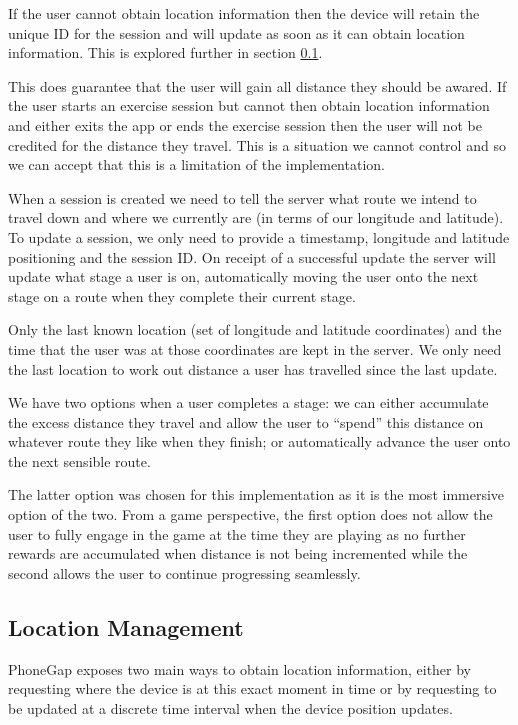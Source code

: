 If the user cannot obtain location information then the device will
retain the unique ID for the session and will update as soon as it can
obtain location information. This is explored further in section
\ref{sec:location_mgmt}.

This does guarantee that the user will gain all distance they should
be awared. If the user starts an exercise session but cannot then
obtain location information and either exits the app or ends the
exercise session then the user will not be credited for the distance
they travel. This is a situation we cannot control and so we can
accept that this is a limitation of the implementation.

When a session is created we need to tell the server what route we
intend to travel down and where we currently are (in terms of our
longitude and latitude). To update a session, we only need to provide
a timestamp, longitude and latitude positioning and the session
ID. On receipt of a successful update the server will update what
stage a user is on, automatically moving the user onto the next stage
on a route when they complete their current stage. 

Only the last known location (set of longitude and latitude
coordinates) and the time that the user was at those coordinates are
kept in the server. We only need the last location 
to work out distance a user has travelled since the last update. 

We have two options when a user completes a stage: we can either
accumulate the excess distance they travel and allow the user to
``spend'' this distance on whatever route they like when they finish;
or automatically advance the user onto the next sensible route. 

The latter option was chosen for this implementation as it is the most
immersive option of the two. From a game perspective, the first option
does not allow the user to fully engage in the game at the time they
are playing as no further rewards are accumulated when distance is not
being incremented while the second allows the user to continue
progressing seamlessly. 

\subsection{Location Management}
\label{sec:location_mgmt}
PhoneGap exposes two main ways to obtain location information, either
by requesting where the device is at this exact moment in
time\cite{phonegap_currentpos} or by requesting to be updated at a
discrete time interval when the device position
updates\cite{phonegap_watchpos}. 

